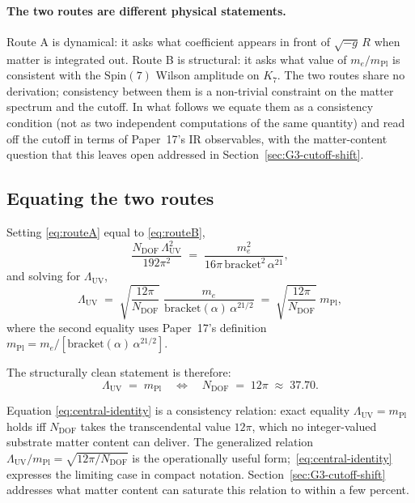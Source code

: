 \documentclass[11pt]{article}
\newcommand{\mPl}{m_{\mathrm{Pl}}}
\newcommand{\me}{m_e}
\begin{document}
\paragraph{The two routes are different physical statements.}
Route A is dynamical: it asks what coefficient appears in front of
$\sqrt{-g}\,R$ when matter is integrated out.  Route B is
structural: it asks what value of $\me/\mPl$ is consistent with the
$\mathrm{Spin}(7)$ Wilson amplitude on $K_7$.  The two routes share
no derivation; consistency between them is a non-trivial constraint
on the matter spectrum and the cutoff.  In what follows we equate
them as a consistency condition (not as two independent
computations of the same quantity) and read off the cutoff in terms
of Paper~17's IR observables, with the matter-content question
that this leaves open addressed in Section~\ref{sec:G3-cutoff-shift}.

\subsection{Equating the two routes}

Setting \eqref{eq:routeA} equal to \eqref{eq:routeB},
\begin{equation}
  \frac{N_{\mathrm{DOF}}\,\Lambda_{\mathrm{UV}}^2}{192\pi^2}
   \;=\;
   \frac{\me^2}{16\pi\,\mathrm{bracket}^2\,\alpha^{21}},
  \label{eq:match-eq}
\end{equation}
and solving for $\Lambda_{\mathrm{UV}}$,
\begin{equation}
  \Lambda_{\mathrm{UV}}
   \;=\;
   \sqrt{\frac{12\pi}{N_{\mathrm{DOF}}}}\;
   \frac{\me}{\mathrm{bracket}(\alpha)\,\alpha^{21/2}}
   \;=\;
   \sqrt{\frac{12\pi}{N_{\mathrm{DOF}}}}\;\mPl,
  \label{eq:lambda-uv-K7}
\end{equation}
where the second equality uses Paper~17's definition
$\mPl = \me / [\mathrm{bracket}(\alpha)\,\alpha^{21/2}]$.

The structurally clean statement is therefore:
\begin{equation}
  \boxed{\;
    \Lambda_{\mathrm{UV}}
     \;=\;
     \mPl
    \quad\Longleftrightarrow\quad
    N_{\mathrm{DOF}}
     \;=\;
     12\pi\;\approx\;37.70.
  \;}
  \label{eq:central-identity}
\end{equation}

Equation \eqref{eq:central-identity} is a consistency relation:
exact equality $\Lambda_{\mathrm{UV}} = \mPl$ holds iff
$N_{\mathrm{DOF}}$ takes the transcendental value $12\pi$, which no
integer-valued substrate matter content can deliver.  The
generalized relation $\Lambda_{\mathrm{UV}}/\mPl =
\sqrt{12\pi/N_{\mathrm{DOF}}}$ is the operationally useful form;\
\eqref{eq:central-identity} expresses the limiting case in compact
notation.  Section~\ref{sec:G3-cutoff-shift} addresses what
matter content can saturate this relation to within a few percent.
\end{document}
